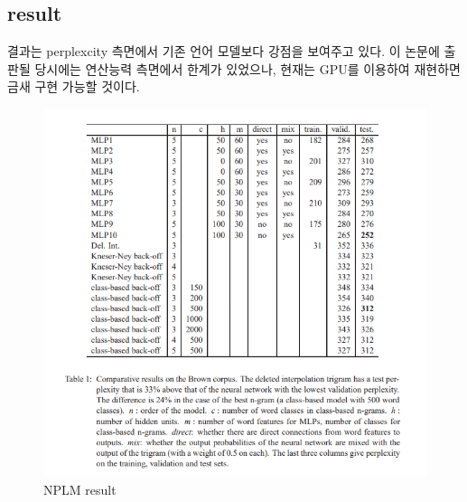 \documentclass[
	11pt,
	a4paper,
	figtabcapt,
]{oblivoir}
\begin{document}
\subsection{result}
결과는 perplexcity 측면에서 기존 언어 모델보다 강점을 보여주고 있다.
이 논문에 출판될 당시에는 연산능력 측면에서 한계가 있었으나, 현재는 GPU를 이용하여 재현하면 금새 구현 가능할 것이다.
\begin{figure}[htp]
	\centering
	\includegraphics[width=\textwidth]{figures/NPLM_result.png} 
	\caption{NPLM result}
	\label{fig:NPLM}
\end{figure}

\clearpage
\end{document}
